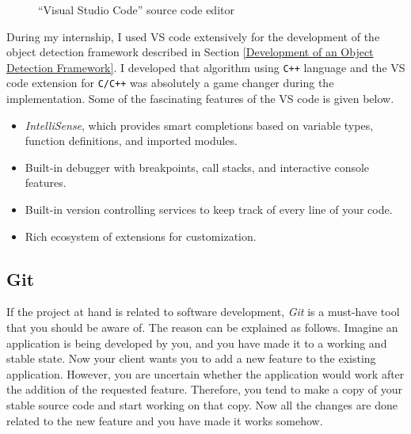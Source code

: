 \documentclass[a4paper,12pt]{report}%
\begin{document}
\begin{figure}[H]
	\centering
	\caption{``Visual Studio Code'' source code editor}
	\label{fig:vscode}
\end{figure}

During my internship, I used VS code extensively for the development of the object detection framework described in Section \ref{Development of an Object Detection Framework}. I developed that algorithm using {\tt C++} language and the VS code extension for {\tt C/C++} was absolutely a game changer during the implementation. Some of the fascinating features of the VS code is given below\cite{vscode}.

\begin{itemize}
	\item \textit{IntelliSense}, which provides smart completions based on variable types, function definitions, and imported modules.
	
	\item Built-in debugger with breakpoints, call stacks, and interactive console features.
	
	\item Built-in version controlling services to keep track of every line of your code.
	
	\item Rich ecosystem of extensions for customization.
\end{itemize}



\subsection{Git}

If the project at hand is related to software development, \textit{Git} is a must-have tool that you should be aware of. The reason can be explained as follows. Imagine an application is being developed by you, and you have made it to a working and stable state. Now your client wants you to add a new feature to the existing application. However, you are uncertain whether the application would work after the addition of the requested feature. Therefore, you tend to make a copy of your stable source code and start working on that copy. Now all the changes are done related to the new feature and you have made it works somehow.\\
\end{document}
